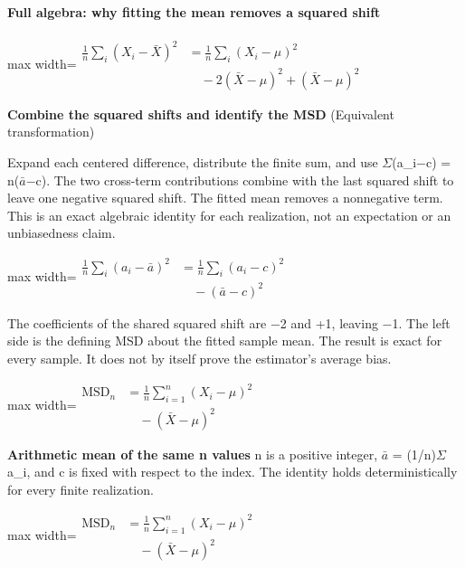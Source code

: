 \documentclass[11pt,a4paper]{article}
\begin{document}
\paragraph{Full algebra: why fitting the mean removes a squared shift}
\begin{center}\begin{adjustbox}{max width=\linewidth}$\displaystyle \begin{aligned}\frac1n\sum_i(X_i-\bar X)^2&=\frac1n\sum_i(X_i-\mu)^2\\&\quad-2(\bar X-\mu)^2+(\bar X-\mu)^2\end{aligned}$\end{adjustbox}\end{center}
\noindent\textbf{Combine the squared shifts and identify the MSD} (Equivalent transformation)\par
Expand each centered difference, distribute the finite sum, and use \ensuremath{\Sigma}(a\_i\ensuremath{-}c) = n(\ensuremath{\bar{a}}\ensuremath{-}c). The two cross-term contributions combine with the last squared shift to leave one negative squared shift. The fitted mean removes a nonnegative term. This is an exact algebraic identity for each realization, not an expectation or an unbiasedness claim.
\begin{center}\begin{adjustbox}{max width=\linewidth}$\displaystyle \begin{aligned}\frac1n\sum_i(a_i-\bar a)^2&=\frac1n\sum_i(a_i-c)^2\\&\quad-(\bar a-c)^2\end{aligned}$\end{adjustbox}\end{center}

The coefficients of the shared squared shift are \ensuremath{-}2 and +1, leaving \ensuremath{-}1. The left side is the defining MSD about the fitted sample mean. The result is exact for every sample. It does not by itself prove the estimator's average bias.
\begin{center}\begin{adjustbox}{max width=\linewidth}$\displaystyle \boxed{\begin{aligned}\mathrm{MSD}_n&=\frac1n\sum_{i=1}^n(X_i-\mu)^2\\&\quad-(\bar X-\mu)^2\end{aligned}}$\end{adjustbox}\end{center}

\par\textbf{Arithmetic mean of the same n values} n is a positive integer, \ensuremath{\bar{a}} = (1/n)\ensuremath{\Sigma}a\_i, and c is fixed with respect to the index. The identity holds deterministically for every finite realization.
\begin{center}\begin{adjustbox}{max width=\linewidth}$\displaystyle \boxed{\begin{aligned}\mathrm{MSD}_n&=\frac1n\sum_{i=1}^n(X_i-\mu)^2\\&\quad-(\bar X-\mu)^2\end{aligned}}$\end{adjustbox}\end{center}
\end{document}
